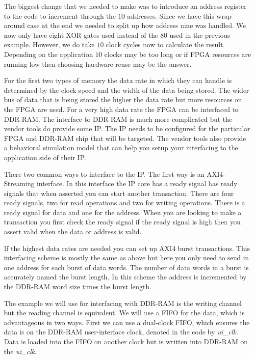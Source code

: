 The biggest change that we needed to make was to introduce an address register to the code to increment through the $10$ addresses. Since we have this wrap around case at the end we needed to split up how address nine was handled. We now only have eight \ac{XOR} gates used instead of the $80$ used in the previous example. However, we do take $10$ clock cycles now to calculate the result. Depending on the application $10$ clocks may be too long or if \ac{FPGA} resources are running low then choosing hardware reuse may be the answer. 
	
For the first two types of memory the data rate in which they can handle is determined by the clock speed and the width of the data being stored. The wider bus of data that is being stored the higher the data rate but more resources on the \ac{FPGA} are used. For a very high data rate the \ac{FPGA} can be interfaced to \ac{DDR}-\ac{RAM}. The interface to \ac{DDR}-\ac{RAM} is much more complicated but the vendor tools do provide some \ac{IP}. The \ac{IP} needs to be configured for the particular \ac{FPGA} and \ac{DDR}-\ac{RAM} chip that will be targeted. The vendor tools also provide a behavioral simulation model that can help you setup your interfacing to the application side of their \ac{IP}. 

There two common ways to interface to the \ac{IP}. The first way is an \ac{AXI4}-Streaming interface. In this interface the \ac{IP} core has a ready signal has ready signals that when asserted you can start another transaction. There are four ready signals, two for read operations and two for writing operations. There is a ready signal for data and one for the address. When you are looking to make a transaction you first check the ready signal if the ready signal is high then you assert valid when the data or address is valid. 

If the highest data rates are needed you can set up \ac{AXI4} burst transactions. This interfacing scheme is mostly the same as above but here you only need to send in one address for each burst of data words. The number of data words in a burst is accurately named the burst length. In this scheme the address is incremented by the \ac{DDR}-\ac{RAM} word size times the burst length.  

The example we will use for interfacing with \ac{DDR}-\ac{RAM} is the writing channel but the reading channel is equivalent. We will use a \ac{FIFO} for the data, which is advantageous in two ways. First we can use a dual-clock \ac{FIFO}, which ensures the data is on the \ac{DDR}-\ac{RAM} user-interface clock, denoted in the code by \emph{ui\_clk}. Data is loaded into the \ac{FIFO} on another clock but is written into \ac{DDR}-\ac{RAM} on the \emph{ui\_clk}. 

